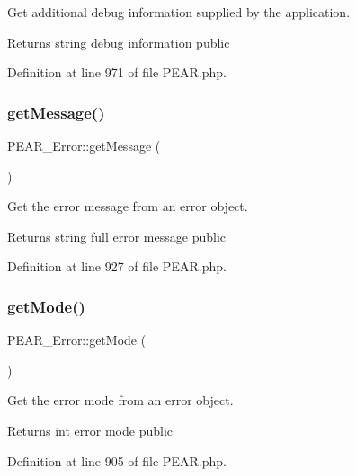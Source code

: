 Get additional debug information supplied by the application.

\begin{DoxyReturn}{Returns}
string debug information  public 
\end{DoxyReturn}


Definition at line 971 of file P\+E\+A\+R.\+php.

\mbox{\label{classPEAR__Error_a00beb48b680580de68477d0f77e27510}} 
\subsubsection{\texorpdfstring{get\+Message()}{getMessage()}}
{\footnotesize\ttfamily P\+E\+A\+R\+\_\+\+Error\+::get\+Message (\begin{DoxyParamCaption}{ }\end{DoxyParamCaption})}

Get the error message from an error object.

\begin{DoxyReturn}{Returns}
string full error message  public 
\end{DoxyReturn}


Definition at line 927 of file P\+E\+A\+R.\+php.

\mbox{\label{classPEAR__Error_adf8ebb12d192a152c0f3f80b5ca01e7c}} 
\subsubsection{\texorpdfstring{get\+Mode()}{getMode()}}
{\footnotesize\ttfamily P\+E\+A\+R\+\_\+\+Error\+::get\+Mode (\begin{DoxyParamCaption}{ }\end{DoxyParamCaption})}

Get the error mode from an error object.

\begin{DoxyReturn}{Returns}
int error mode  public 
\end{DoxyReturn}


Definition at line 905 of file P\+E\+A\+R.\+php.

